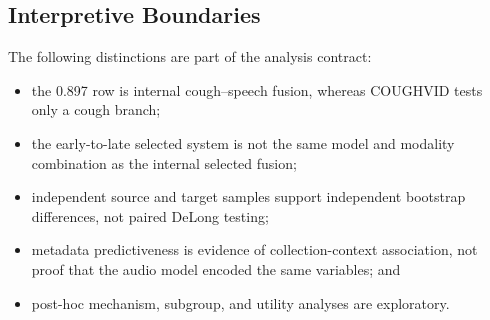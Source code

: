 \subsection{Interpretive Boundaries}

The following distinctions are part of the analysis contract:

\begin{itemize}
    \item the 0.897 row is internal cough--speech fusion, whereas COUGHVID tests
    only a cough branch;
    \item the early-to-late selected system is not the same model and modality
    combination as the internal selected fusion;
    \item independent source and target samples support independent bootstrap
    differences, not paired DeLong testing;
    \item metadata predictiveness is evidence of collection-context
    association, not proof that the audio model encoded the same variables;
    and
    \item post-hoc mechanism, subgroup, and utility analyses are exploratory.
\end{itemize}
